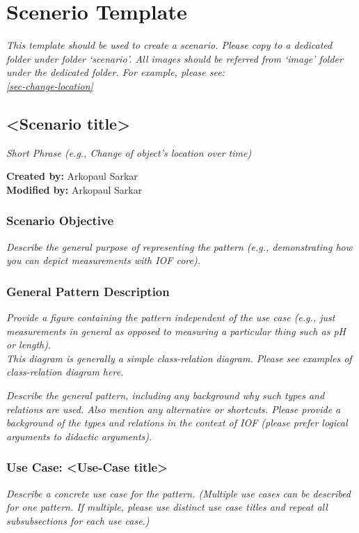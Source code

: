 \chapter{Scenerio Template}
\label{chapter-scenario-template}
\textit{This template should be used to create a scenario. Please copy to a dedicated folder under folder `scenario'. All images should be referred from `image' folder under the dedicated folder. For example, please see: \\
\cref{sec-change-location}}

\section*{<Scenario title>}

\textit{Short Phrase (e.g., Change of object's location over time)}

\textbf{Created by:} Arkopaul Sarkar \\
\textbf{Modified by:} Arkopaul Sarkar \\

\subsection*{Scenario Objective}
\textit{ 
Describe the general purpose of representing the pattern (e.g., demonstrating how you can depict measurements with IOF core).}

\subsection*{General Pattern Description}

\textit{  
Provide a figure containing the pattern independent of the use case (e.g., just measurements in general as opposed to measuring a particular thing such as pH or length). \\
\noindent \textit{This diagram is generally a simple class-relation diagram. Please see examples of class-relation diagram here.}
  }

\textit{ 
Describe the general pattern, including any background why such types and relations are used. Also mention any alternative or shortcuts. Please provide a background of the types and relations in the context of IOF (please prefer logical arguments to didactic arguments).
}


\subsection*{Use Case: <Use-Case title>}
 \textit{ 
Describe a concrete use case for the pattern. (Multiple use cases can be described for one pattern. If multiple, please use distinct use case titles and repeat all subsubsections for each use case.)
  }


